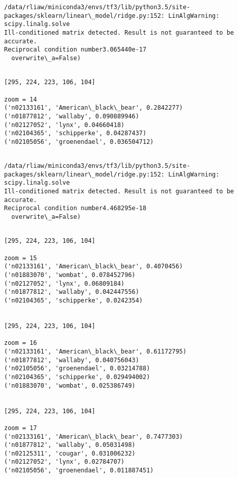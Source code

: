 \documentclass[11pt]{article}
\begin{document}
    \begin{Verbatim}[commandchars=\\\{\}]
/data/rliaw/miniconda3/envs/tf3/lib/python3.5/site-packages/sklearn/linear\_model/ridge.py:152: LinAlgWarning: scipy.linalg.solve
Ill-conditioned matrix detected. Result is not guaranteed to be accurate.
Reciprocal condition number3.065440e-17
  overwrite\_a=False)

    \end{Verbatim}

    \begin{Verbatim}[commandchars=\\\{\}]

[295, 224, 223, 106, 104]

zoom = 14
('n02133161', 'American\_black\_bear', 0.2842277)
('n01877812', 'wallaby', 0.090889946)
('n02127052', 'lynx', 0.04660418)
('n02104365', 'schipperke', 0.04287437)
('n02105056', 'groenendael', 0.036504712)


    \end{Verbatim}

    \begin{Verbatim}[commandchars=\\\{\}]
/data/rliaw/miniconda3/envs/tf3/lib/python3.5/site-packages/sklearn/linear\_model/ridge.py:152: LinAlgWarning: scipy.linalg.solve
Ill-conditioned matrix detected. Result is not guaranteed to be accurate.
Reciprocal condition number4.468295e-18
  overwrite\_a=False)

    \end{Verbatim}

    \begin{Verbatim}[commandchars=\\\{\}]

[295, 224, 223, 106, 104]

zoom = 15
('n02133161', 'American\_black\_bear', 0.4070456)
('n01883070', 'wombat', 0.078452796)
('n02127052', 'lynx', 0.06809184)
('n01877812', 'wallaby', 0.042447556)
('n02104365', 'schipperke', 0.0242354)


[295, 224, 223, 106, 104]

zoom = 16
('n02133161', 'American\_black\_bear', 0.61172795)
('n01877812', 'wallaby', 0.040756043)
('n02105056', 'groenendael', 0.03214788)
('n02104365', 'schipperke', 0.029494002)
('n01883070', 'wombat', 0.025386749)


[295, 224, 223, 106, 104]

zoom = 17
('n02133161', 'American\_black\_bear', 0.7477303)
('n01877812', 'wallaby', 0.05031498)
('n02125311', 'cougar', 0.031006232)
('n02127052', 'lynx', 0.02784707)
('n02105056', 'groenendael', 0.011887451)


    \end{Verbatim}
\end{document}
